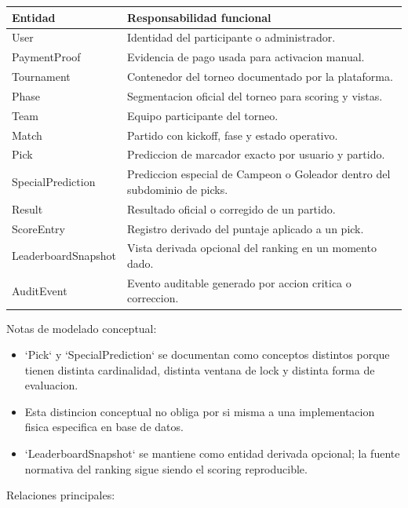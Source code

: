 \begin{longtable}{p{}p{}}
\toprule
\textbf{Entidad} & \textbf{Responsabilidad funcional} \\
\midrule
User & Identidad del participante o administrador. \\
PaymentProof & Evidencia de pago usada para activacion manual. \\
Tournament & Contenedor del torneo documentado por la plataforma. \\
Phase & Segmentacion oficial del torneo para scoring y vistas. \\
Team & Equipo participante del torneo. \\
Match & Partido con kickoff, fase y estado operativo. \\
Pick & Prediccion de marcador exacto por usuario y partido. \\
SpecialPrediction & Prediccion especial de Campeon o Goleador dentro del subdominio de picks. \\
Result & Resultado oficial o corregido de un partido. \\
ScoreEntry & Registro derivado del puntaje aplicado a un pick. \\
LeaderboardSnapshot & Vista derivada opcional del ranking en un momento dado. \\
AuditEvent & Evento auditable generado por accion critica o correccion. \\
\bottomrule
\end{longtable}

Notas de modelado conceptual:

\begin{itemize}
  \item `Pick` y `SpecialPrediction` se documentan como conceptos distintos porque tienen distinta cardinalidad, distinta ventana de lock y distinta forma de evaluacion.
  \item Esta distincion conceptual no obliga por si misma a una implementacion fisica especifica en base de datos.
  \item `LeaderboardSnapshot` se mantiene como entidad derivada opcional; la fuente normativa del ranking sigue siendo el scoring reproducible.
\end{itemize}

Relaciones principales:

